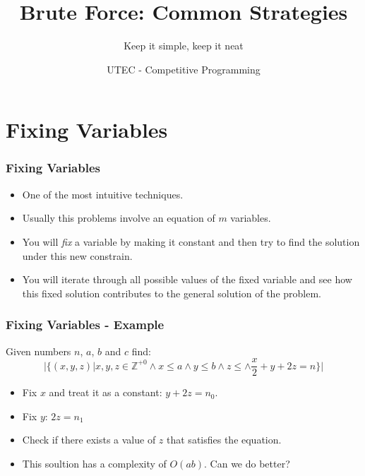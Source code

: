 \documentclass{beamer}
\begin{document}
\newcommand{\tabitem}{~~\llap{\textbullet}~~}




\title{Brute Force: Common Strategies}
\subtitle{Keep it simple, keep it neat}
\author{UTEC - Competitive Programming}
\date{}

\maketitle

\section{Fixing Variables}

\begin{frame}
	\frametitle{Fixing Variables}

	\begin{itemize}
		\item One of the most intuitive techniques.
		\item Usually this problems involve an equation of $m$ variables.
		\item You will \textit{fix} a variable by making it constant and then try to find the solution under this new constrain.
		\item You will iterate through all possible values of the fixed variable and see how this fixed solution contributes to the general solution of the problem.
	\end{itemize}
\end{frame}

\begin{frame}[fragile]
	\frametitle{Fixing Variables - Example}

	Given numbers $n$, $a$, $b$ and $c$ find:
	$$|\{(x, y, z) | x, y, z \in \mathbb{Z}^{+0}
	\wedge x \leq a \wedge y \leq b \wedge z \leq
	\wedge \frac{x}{2} + y + 2z = n\}|$$

	\begin{itemize}
		\item<2-> Fix $x$ and treat it as a constant: $y + 2z = n_0$.
		\item<3-> Fix $y$: $2z = n_1$
		\item<4-> Check if there exists a value of $z$ that satisfies the equation.
		\item<5-> This soultion has a complexity of $O(ab)$. Can we do better?
	\end{itemize}
\end{frame}
\end{document}
